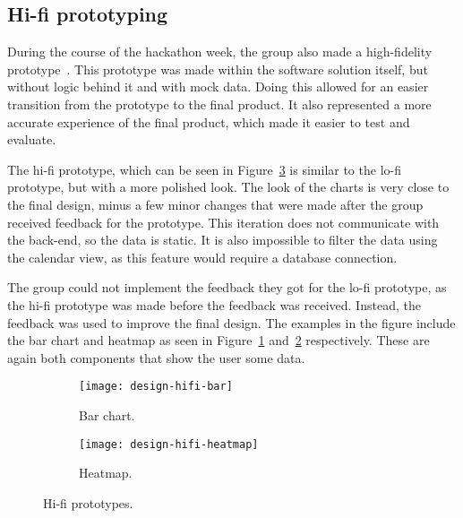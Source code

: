 \subsection{Hi-fi prototyping}\label{subsec:hi-fi-prototyping}

During the course of the hackathon week, the group also made a high-fidelity prototype~\cite{hi-lo-fidelity}.
This prototype was made within the software solution itself, but without logic behind it and with mock data.
Doing this allowed for an easier transition from the prototype to the final product.
It also represented a more accurate experience of the final product, which made it easier to test and evaluate.

The hi-fi prototype, which can be seen in Figure~\ref{fig:hifi-prototype} is similar to the lo-fi prototype, but with a
more polished look.
The look of the charts is very close to the final design, minus a few minor changes that were made after the group
received feedback for the prototype.
This iteration does not communicate with the back-end, so the data is static.
It is also impossible to filter the data using the calendar view, as this feature would require a database connection.

The group could not implement the feedback they got for the lo-fi prototype, as the hi-fi prototype was made before
the feedback was received.
Instead, the feedback was used to improve the final design.
The examples in the figure include the bar chart and heatmap as seen in Figure~\ref{subfig:hifi-bar}
and~\ref{subfig:hifi-heatmap} respectively.
These are again both components that show the user some data.

\begin{figure}[H]
    \centering
    \begin{subfigure}{.75\textwidth}
        \centering
        \texttt{[image: design-hifi-bar]}
        \caption{Bar chart.
        }\label{subfig:hifi-bar}
    \end{subfigure}
    \par\medskip
    \begin{subfigure}{.75\textwidth}
        \centering
        \texttt{[image: design-hifi-heatmap]}
        \caption{Heatmap.
        }\label{subfig:hifi-heatmap}
    \end{subfigure}
    \caption{Hi-fi prototypes.
    }\label{fig:hifi-prototype}
\end{figure}
